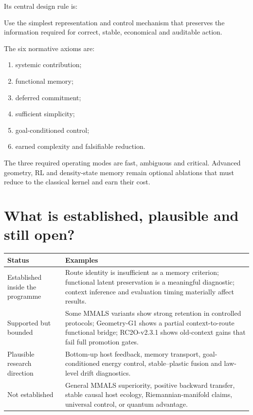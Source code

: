\documentclass[11pt,a4paper]{article}
\newcommand{\tablehead}[1]{\cellcolor{DeepTeal}\color{white}\bfseries #1}
\begin{document}
Its central design rule is:
\begin{keybox}
Use the simplest representation and control mechanism that preserves the information required for correct, stable, economical and auditable action.
\end{keybox}

The six normative axioms are:
\begin{enumerate}[leftmargin=1.6em]
\item systemic contribution;
\item functional memory;
\item deferred commitment;
\item sufficient simplicity;
\item goal-conditioned control;
\item earned complexity and falsifiable reduction.
\end{enumerate}

The three required operating modes are fast, ambiguous and critical. Advanced geometry, RL and density-state memory remain optional ablations that must reduce to the classical kernel and earn their cost.

\newpage
\section{What is established, plausible and still open?}

\begin{tabularx}{\textwidth}{p{3.2cm}X}
\toprule
\tablehead{Status} & \tablehead{Examples}\\
\midrule
Established inside the programme & Route identity is insufficient as a memory criterion; functional latent preservation is a meaningful diagnostic; context inference and evaluation timing materially affect results.\\
Supported but bounded & Some MMALS variants show strong retention in controlled protocols; Geometry-G1 shows a partial context-to-route functional bridge; RC2O-v2.3.1 shows old-context gains that fail full promotion gates.\\
Plausible research direction & Bottom-up host feedback, memory transport, goal-conditioned energy control, stable--plastic fusion and law-level drift diagnostics.\\
Not established & General MMALS superiority, positive backward transfer, stable causal host ecology, Riemannian-manifold claims, universal control, or quantum advantage.\\
\bottomrule
\end{tabularx}
\end{document}
